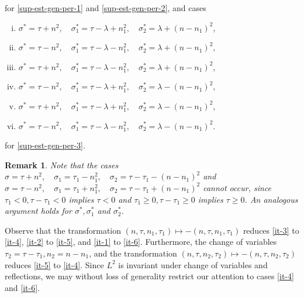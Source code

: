 \documentclass[12pt,reqno]{amsart}
\numberwithin{equation}{section}  %
\newtheorem{remark}[theorem]{Remark}
\begin{document}
%
for \eqref{sup-est-gen-per-1} and \eqref{sup-est-gen-per-2}, and cases
%
\begin{enumerate}[(i)]
\item $ \sigma^{*}=\tau+n^2,\quad \sigma^{*}_1=\tau - \lambda+n_1^2,\quad
  \sigma^{*}_2=\lambda+(n - n_1)^2$, \label{it-1-star} \item $
  \sigma^{*}=\tau-n^2,\quad \sigma^{*}_1=\tau - \lambda-n_1^2,\quad
  \sigma^{*}_2=\lambda+(n - n_1)^2$, \label{it-2-star} \item
  $\sigma^{*}=\tau+n^2,\quad \sigma^{*}_1=\tau - \lambda-n_1^2,\quad
  \sigma^{*}_2=\lambda+(n - n_1)^2$, \label{it-3-star} \item
  $\sigma^{*}=\tau-n^2,\quad \sigma^{*}_1=\tau - \lambda+n_1^2,\quad
  \sigma^{*}_2=\lambda-(n - n_1)^2$, \label{it-4-star} \item
  $\sigma^{*}=\tau+n^2,\quad \sigma^{*}_1=\tau - \lambda+n_1^2,\quad
  \sigma^{*}_2=\lambda-(n - n_1)^2$, \label{it-5-star} \item
  $\sigma^{*}=\tau-n^2,\quad \sigma^{*}_1=\tau - \lambda-n_1^2,\quad
  \sigma^{*}_2= \lambda-(n - n_1)^2$.  \label{it-6-star}
  \end{enumerate}
for \eqref{sup-est-gen-per-3}.
%
%
\begin{framed}
\begin{remark}
Note that the cases $\sigma=\tau+n^2,\quad \sigma_1=\tau_1-n_1^2,\quad
\sigma_2=\tau - \tau_1-(n - n_1)^2$ and $\sigma=\tau-n^2,\quad
\sigma_1=\tau_1+n_1^2,\quad \sigma_2=\tau - \tau_1+(n - n_1)^2$ cannot occur, since
$\tau_1< 0, \tau-\tau_1< 0$ implies $\tau<0$ and $\tau_1\geq 0, \tau-\tau_1\geq
0$ implies $\tau\geq 0$. An analogous argument holds for $\sigma^{*},
\sigma_{1}^{*}$ and $\sigma_{2}^{*}$.
\end{remark}
\end{framed}
%
Observe that the transformation $(n, \tau, n_{1}, \tau_{1}) \mapsto -(n, \tau,
n_{1}, \tau_{1})$ reduces \eqref{it-3} to \eqref{it-4}, \eqref{it-2} to
\eqref{it-5}, and \eqref{it-1} to \eqref{it-6}. Furthermore, the change of
variables $\tau_{2} = \tau - \tau_{1}, n_{2} = n - n_{1}$, and the
transformation $(n, \tau, n_{2}, \tau_{2}) \mapsto - (n, \tau, n_{2},
\tau_{2})$ reduces \eqref{it-5} to \eqref{it-4}. Since $L^{2}$ is invariant
under change of variables and reflections, we may without loss of generality
restrict our attention to cases \eqref{it-4} and \eqref{it-6}.
\end{document}
